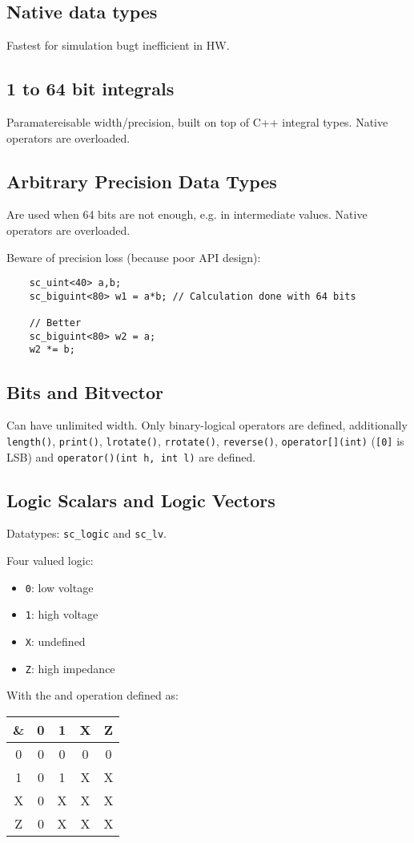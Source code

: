 \subsection{Native data types}
Fastest for simulation bugt inefficient in HW.

\subsection{1 to 64 bit integrals}
Paramatereisable width/precision, built on top of C++ integral types.
Native operators are overloaded.

\subsection{Arbitrary Precision Data Types}
Are used when 64 bits are not enough, e.g. in intermediate values.
Native operators are overloaded.

Beware of precision loss (because poor API design):
\begin{lstlisting}
    sc_uint<40> a,b;
    sc_biguint<80> w1 = a*b; // Calculation done with 64 bits

    // Better
    sc_biguint<80> w2 = a;
    w2 *= b;
\end{lstlisting}

\subsection{Bits and Bitvector}
Can have unlimited width. Only binary-logical operators are defined,
additionally \lstinline{length()}, \lstinline{print()}, \lstinline{lrotate()}, \lstinline{rrotate()}, \lstinline{reverse()}, \lstinline{operator[](int)} (\lstinline{[0]} is LSB) and \lstinline{operator()(int h, int l)} are defined.

\subsection{Logic Scalars and Logic Vectors}
Datatypes: \lstinline{sc_logic} and \lstinline{sc_lv}.

Four valued logic:
\begin{itemize}
    \item \lstinline{0}: low voltage
    \item \lstinline{1}: high voltage
    \item \lstinline{X}: undefined
    \item \lstinline{Z}: high impedance
\end{itemize}
With the and operation defined as:
\begin{table}[H]
    \centering
    \begin{tabular}{c|cccc}
        \toprule
        \& & 0 & 1 & X & Z \\
        \midrule
        0 & 0 & 0 & 0 & 0 \\
        1 & 0 & 1 & X & X \\
        X & 0 & X & X & X \\
        Z & 0 & X & X & X \\
        \bottomrule 
    \end{tabular}
\end{table}

